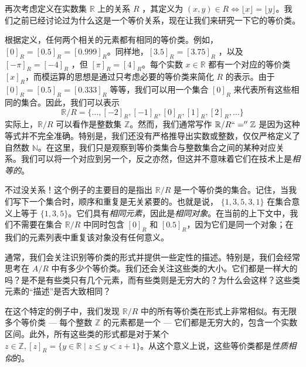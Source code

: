 \begin{example}
    再次考虑定义在实数集 $\mathbb{R}$ 上的关系 $R$ ，其定义为 $(x, y) ∈ R \iff \lfloor x \rfloor = \lfloor y \rfloor$。我们之前已经讨论过为什么这是一个等价关系，现在让我们来研究一下它的等价类。

    根据定义，任何两个相关的元素都有相同的等价类。例如，$[0]_R = [0.5]_R = [0.999]_R$。同样地，$[3.5]_R = [3.75]_R$ ，以及 $[-\pi]_R = [-4]_R$ ，但 $[\pi]_R = [4]_R$。每个实数 $x \in \mathbb{R}$ 都有一个对应的等价类 $[x]_R$，而模运算的思想是通过只考虑必要的等价类来简化 $R$ 的表示。由于 $[0]_R = [0.5]_R = [0.333]_R$ 等等，我们可以用一个集合 $[0]_R$ 来代表所有这些相同的集合。因此，我们可以表示
    \[\mathbb{R} / R = \{\dots, [-2]_R, [-1]_R, [0]_R, [1]_R, [2]_R, \dots \}\]
    实际上，$\mathbb{R} / R$ 可以看作是整数集 $\mathbb{Z}$。然而，我们通常写作 $\mathbb{R} / R ``='' \mathbb{Z}$ 是因为这种等式并不完全准确。特别是，我们还没有严格推导出实数或整数，仅仅严格定义了自然数 $\mathbb{N}$。在这里，我们只是观察到等价类集合与整数集合之间的某种对应关系。我们可以将一个对应到另一个，反之亦然，但这并不意味着它们在技术上是\emph{相等的}。

    不过没关系！这个例子的主要目的是指出 $\mathbb{R} / R$ 是一个等价类的集合。记住，当我们写下一个集合时，顺序和重复是无关紧要的。也就是说， $\{1, 3, 5, 3, 1\}$ 在集合意义上等于 $\{1, 3, 5\}$。它们具有\emph{相同元素}，因此是\emph{相同对象}。在当前的上下文中，我们不需要在集合  $\mathbb{R} / R$ 中同时包含 $[0]_R$ 和 $[0.5]_R$，因为它们是同一个对象；在我们的元素列表中重复该对象没有任何意义。

    通常，我们会关注识别等价类的形式并提供一些定性的描述。特别是，我们会经常思考在 $A/R$ 中有多少个等价类。我们还会关注这些类的大小。它们都是一样大的吗？是不是有些类只有几个元素，而有些类则是无穷大的？为什么会这样？这些类元素的``描述''是否大致相同？

    在这个特定的例子中，我们发现 $\mathbb{R} / R$ 中的所有等价类在形式上非常相似。有无限多个等价类 --- 每个整数 $\mathbb{Z}$ 的元素都是一个 --- 它们都是无穷大的，包含一个实数区间。此外，所有这些类的形式都是对于某个 $z \in \mathbb{Z}, [z]_R = \{y \in \mathbb{R} \mid z \le y < z + 1\}$。从这个意义上说，这些等价类都是\emph{性质相似}的。
\end{example}

